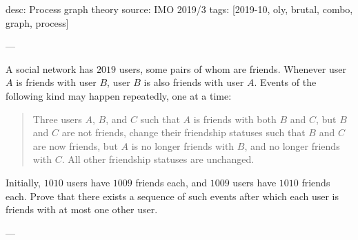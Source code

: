 desc: Process graph theory
source: IMO 2019/3
tags: [2019-10, oly, brutal, combo, graph, process]

---

A social network has $2019$ users, some pairs of whom are friends. Whenever user $A$ is friends with user $B$, user $B$ is also friends with user $A$. Events of the following kind may happen repeatedly, one at a time:
\begin{quote}
    Three users $A$, $B$, and $C$ such that $A$ is friends with both $B$ and $C$, but $B$ and $C$ are not friends, change their friendship statuses such that $B$ and $C$ are now friends, but $A$ is no longer friends with $B$, and no longer friends with $C$. All other friendship statuses are unchanged.
\end{quote}
Initially, $1010$ users have $1009$ friends each, and $1009$ users have $1010$ friends each. Prove that there exists a sequence of such events after which each user is friends with at most one other user.

---

